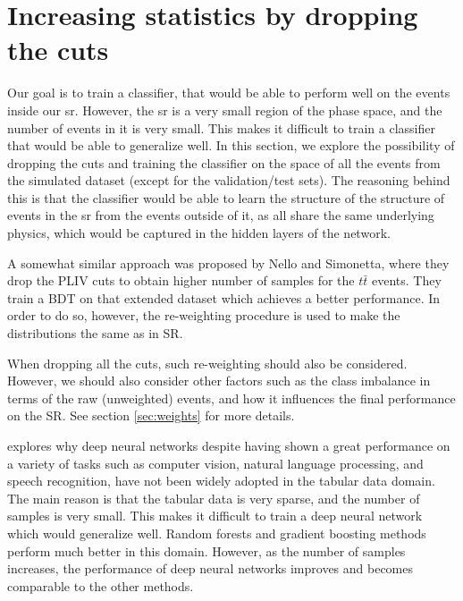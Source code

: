\section{Increasing statistics by dropping the cuts}

Our goal is to train a classifier, that would be able to perform well on the events inside our \gls{sr}. However, the
\gls{sr} is a very small region of the phase space, and the number of events in it is very small. This makes it
difficult to train a classifier that would be able to generalize well. In this section, we explore the possibility of
dropping the cuts and training the classifier on the space of all the events from the simulated dataset (except for the
validation/test sets). The reasoning behind this is that the classifier would be able to learn the structure of the
structure of events in the \gls{sr} from the events outside of it, as all share the same underlying physics, which would
be captured in the hidden layers of the network.

A somewhat similar approach was proposed by Nello and Simonetta, where they drop the PLIV cuts to obtain higher number
of samples for the $t\bar{t}$ events. They train a BDT on that extended dataset which achieves a better performance. In
order to do so, however, the re-weighting procedure is used to make the distributions the same as in SR.

When dropping all the cuts, such re-weighting should also be considered. However, we should also consider other factors
such as the class imbalance in terms of the raw (unweighted) events, and how it influences the final performance on the
SR. See section \ref{sec:weights} for more details.

\cite{tabular} explores why deep neural networks despite having shown a great performance on a variety of tasks such as
computer vision, natural language processing, and speech recognition, have not been widely adopted in the tabular data
domain. The main reason is that the tabular data is very sparse, and the number of samples is very small. This makes it
difficult to train a deep neural network which would generalize well. Random forests and gradient boosting methods
perform much better in this domain. However, as the number of samples increases, the performance of deep neural networks
improves and becomes comparable to the other methods.

